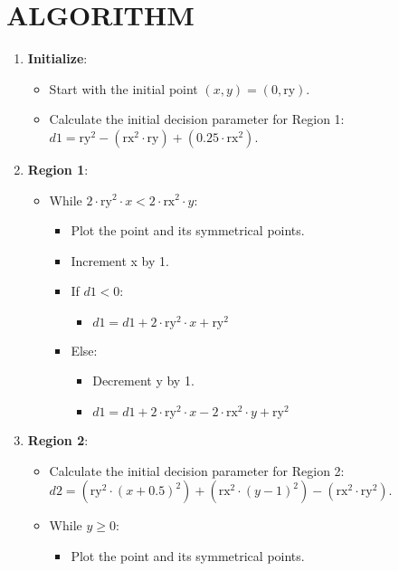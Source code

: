 \documentclass{article}
\begin{document}
\section*{ALGORITHM}
\begin{enumerate}
    \item \textbf{Initialize}:
    \begin{itemize}
        \item Start with the initial point $(x, y) = (0, \text{ry})$.
        \item Calculate the initial decision parameter for Region 1: $d1 = \text{ry}^2 - (\text{rx}^2 \cdot \text{ry}) + (0.25 \cdot \text{rx}^2)$.
    \end{itemize}
    \item \textbf{Region 1}:
    \begin{itemize}
        \item While $2 \cdot \text{ry}^2 \cdot x < 2 \cdot \text{rx}^2 \cdot y$:
        \begin{itemize}
            \item Plot the point and its symmetrical points.
            \item Increment x by 1.
            \item If $d1 < 0$:
            \begin{itemize}
                \item $d1 = d1 + 2 \cdot \text{ry}^2 \cdot x + \text{ry}^2$
            \end{itemize}
            \item Else:
            \begin{itemize}
                \item Decrement y by 1.
                \item $d1 = d1 + 2 \cdot \text{ry}^2 \cdot x - 2 \cdot \text{rx}^2 \cdot y + \text{ry}^2$
            \end{itemize}
        \end{itemize}
    \end{itemize}
    \item \textbf{Region 2}:
    \begin{itemize}
        \item Calculate the initial decision parameter for Region 2: $d2 = (\text{ry}^2 \cdot (x + 0.5)^2) + (\text{rx}^2 \cdot (y - 1)^2) - (\text{rx}^2 \cdot \text{ry}^2)$.
        \item While $y \geq 0$:
        \begin{itemize}
            \item Plot the point and its symmetrical points.

\end{itemize}
\end{itemize}
\end{enumerate}
\end{document}
